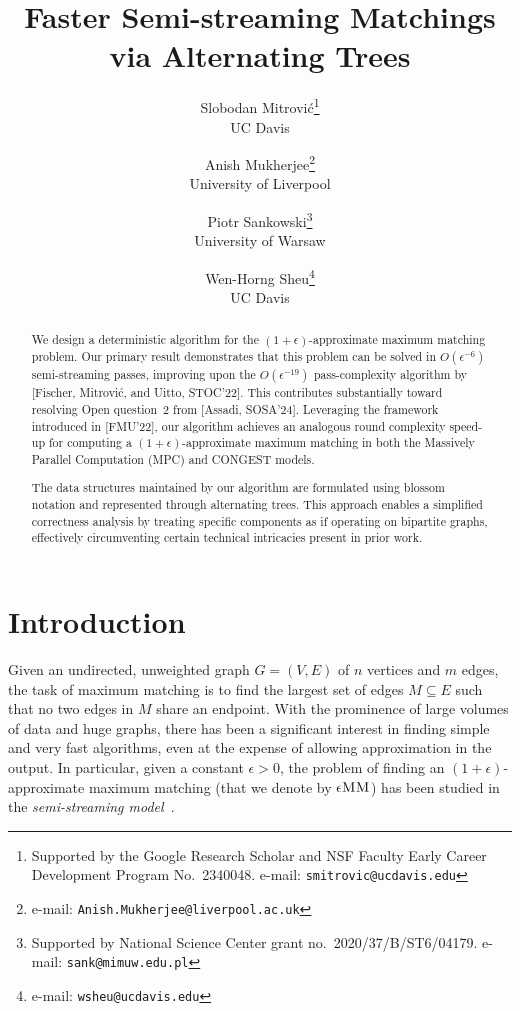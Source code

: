 \documentclass{article}
\title{
Faster Semi-streaming Matchings via Alternating Trees
}
\author{ Slobodan Mitrović\thanks{Supported by the Google Research Scholar and NSF Faculty Early Career Development Program No.~2340048. e-mail: \texttt{smitrovic@ucdavis.edu}} \\ UC Davis 
\and Anish Mukherjee\thanks{e-mail: \texttt{Anish.Mukherjee@liverpool.ac.uk}} \\ University of Liverpool
\and Piotr Sankowski\thanks{Supported by National Science Center grant no.~2020/37/B/ST6/04179. e-mail: \texttt{sank@mimuw.edu.pl}} \\ University of Warsaw
\and Wen-Horng Sheu\thanks{e-mail: \texttt{wsheu@ucdavis.edu}} \\ UC Davis}
\date{ }
\newcommand{\eps}{\epsilon}
\newcommand{\eMM}{\eps\textsc{MM}}
\begin{document}
\maketitle

\begin{abstract}
    We design a deterministic algorithm for the $(1+\epsilon)$-approximate maximum matching problem. 
    Our primary result demonstrates that this problem can be solved in $O(\epsilon^{-6})$ semi-streaming passes, improving upon the $O(\epsilon^{-19})$ pass-complexity algorithm by [Fischer, Mitrović, and Uitto, STOC'22]. 
    This contributes substantially toward resolving Open question~2 from [Assadi, SOSA'24].
    Leveraging the framework introduced in [FMU'22], our algorithm achieves an analogous round complexity speed-up for computing a $(1+\epsilon)$-approximate maximum matching in both the Massively Parallel Computation (MPC) and CONGEST models.

    The data structures maintained by our algorithm are formulated using blossom notation and represented through alternating trees.
    This approach enables a simplified correctness analysis by treating specific components as if operating on bipartite graphs, effectively circumventing certain technical intricacies present in prior work.


    
\end{abstract}

\newpage

\tableofcontents

\newpage

\section{Introduction}




Given an undirected, unweighted graph $G = (V, E)$ of $n$ vertices and $m$ edges, the task of maximum matching is to find the largest set of edges $M \subseteq E$ such that no two edges in $M$ share an endpoint. 
With the prominence of large volumes of data and huge graphs, there has been a significant interest in finding simple and very fast algorithms, even at the expense of allowing approximation in the output.
In particular, given a constant $\eps > 0$, the problem of finding an $(1+\eps)$-approximate maximum matching (that we denote by $\eMM$) has been studied in the \emph{semi-streaming model}~\cite{mcgregor2005finding,ahn2011laminar,ahn2013linear,tirodkar2018deterministic,ahn2018access,gamlath2019weighted,FMU22,assadi2022semi,assadi2024simple,huang2023}.
\end{document}

